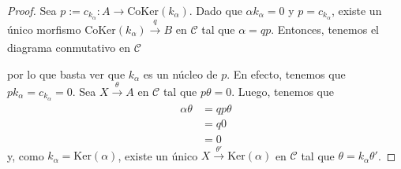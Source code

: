 \documentclass[tesis]{subfiles}
\begin{document}
\begin{proof}

    Sea $p:= c_{k_\alpha}:A\to \text{CoKer}(k_\alpha)$. Dado que $\alpha k_\alpha=0$ y $p=c_{k_\alpha}$, existe un único morfismo $\text{CoKer}(k_\alpha)\xrightarrow[]{q} B$ en $\mathscr{C}$ tal que $\alpha=qp$. Entonces, tenemos el diagrama conmutativo en $\mathscr{C}$
    \begin{center}
    \end{center}
    por lo que basta ver que $k_\alpha$ es un núcleo de $p$. En efecto, tenemos que $pk_\alpha = c_{k_\alpha} = 0$. Sea $X\xrightarrow[]{\theta}A$ en $\mathscr{C}$ tal que $p\theta=0$. Luego, tenemos que
    \begin{align*}
        \alpha\theta &= qp\theta \\
                     &= q0 \\
                     &= 0
    \end{align*}
    y, como $k_\alpha = \text{Ker}(\alpha)$, existe un único $X\xrightarrow[]{\theta'} \text{Ker}(\alpha)$ en $\mathscr{C}$ tal que $\theta = k_{\alpha} \theta'$.
\end{proof}
\end{document}

